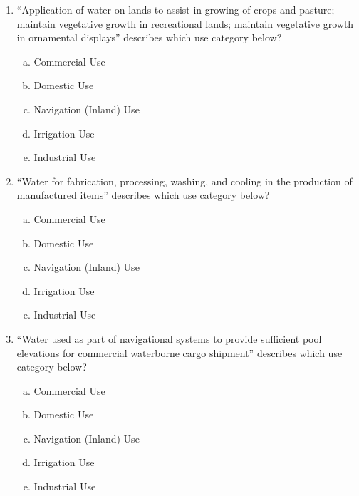 \documentclass[11pt]{article}
\begin{document}
\clearpage
\begin{enumerate}

\item ``Application of water on lands to assist in growing of crops and pasture; maintain vegetative growth in recreational lands; maintain vegetative growth in ornamental displays'' describes which use category below?
\begin{enumerate}[a)]
\item Commercial Use
\item Domestic Use
\item Navigation (Inland) Use
\item Irrigation Use
\item Industrial Use
\end{enumerate}

\item ``Water for fabrication, processing, washing, and cooling in the production of manufactured items'' describes which use category below?
\begin{enumerate}[a)]
\item Commercial Use
\item Domestic Use
\item Navigation (Inland) Use
\item Irrigation Use
\item Industrial Use
\end{enumerate}

\item ``Water used as part of navigational systems to provide sufficient pool elevations for commercial waterborne cargo shipment'' describes which use category below?
\begin{enumerate}[a)]
\item Commercial Use
\item Domestic Use
\item Navigation (Inland) Use
\item Irrigation Use
\item Industrial Use
\end{enumerate}


\end{enumerate}
\end{document}
